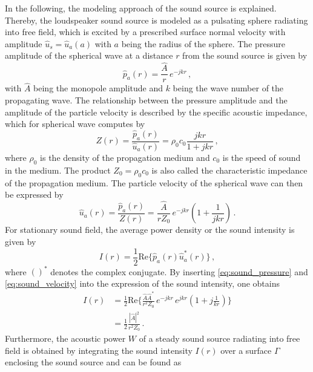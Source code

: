 In the following, the modeling approach of the sound source is explained. Thereby, the loudspeaker sound source is modeled as a pulsating sphere radiating into free field, which is excited by a prescribed surface normal velocity with amplitude $\hat{u}_s = \hat{u}_a(a)$ with $a$ being the radius of the sphere. The pressure amplitude of the spherical wave at a distance $r$ from the sound source is given by
\begin{equation}
	\hat{p}_a(r) = \frac{\hat{A}}{r}\,e^{-jkr}\,, \label{eq:sound_pressure}
\end{equation}
with $\hat{A}$ being the monopole amplitude and $k$ being the wave number of the propagating wave. The relationship between the pressure amplitude and the amplitude of the particle velocity is described by the specific acoustic impedance, which for spherical wave computes by
\begin{equation}
	Z(r) = \frac{\hat{p}_a(r)}{\hat{u}_a(r)} = \rho_0 c_0\frac{jkr}{1+jkr}\,, \label{eq:specific_impedance}
\end{equation}
where $\rho_0$ is the density of the propagation medium and $c_0$ is the speed of sound in the medium. The product $Z_0 = \rho_0 c_0$ is also called the characteristic impedance of the propagation medium. The particle velocity of the spherical wave can then be expressed by
\begin{equation}
	\hat{u}_a(r) = \frac{\hat{p}_a(r)}{Z(r)} = \frac{\hat{A}}{r Z_0}\,e^{-jkr}\left(1+\frac{1}{jkr}\right)\,. \label{eq:sound_velocity}
\end{equation}
For stationary sound field, the average power density or the sound intensity is given by
\begin{equation}
	I(r) = \frac{1}{2}\text{Re}\lbrace\hat{p}_a(r)\hat{u}_a^*(r)\rbrace\,, \label{eq:sound_intensity}
\end{equation}
where $()^*$ denotes the complex conjugate. By inserting \cref{eq:sound_pressure} and \cref{eq:sound_velocity} into the expression of the sound intensity, one obtains
\begin{align}
	I(r) &= \frac{1}{2}\text{Re}\lbrace \frac{\hat{A}\hat{A}^*}{r^2 Z_0}\,e^{-jkr}\,e^{jkr}\left(1+j\frac{1}{kr}\right)\rbrace \\
		 &=\frac{1}{2}\frac{|\hat{A}|^2}{r^2Z_0}\,.
\end{align}
Furthermore, the acoustic power $W$ of a steady sound source radiating into free field is obtained by integrating the sound intensity $I(r)$ over a surface $\Gamma$ enclosing the sound source and can be found as
